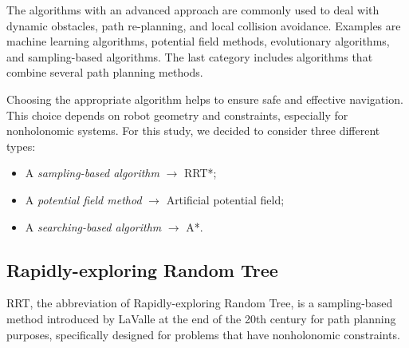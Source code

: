 The algorithms with an advanced approach are commonly used to deal with dynamic obstacles, path re-planning, and local collision avoidance. Examples are machine learning algorithms, potential field methods, evolutionary algorithms, and sampling-based algorithms. The last category includes algorithms that combine several path planning methods.

Choosing the appropriate algorithm helps to ensure safe and effective navigation. This choice depends on robot geometry and constraints, especially for nonholonomic systems. For this study, we decided to consider three different types:
\begin{itemize}[itemsep=0pt]
	\item A \textit{sampling-based algorithm} $\rightarrow$ RRT*;
	\item A \textit{potential field method} $\rightarrow$ Artificial potential field;
	\item A \textit{searching-based algorithm} $\rightarrow$ A*.
\end{itemize}
\subsection{Rapidly-exploring Random Tree}
RRT, the abbreviation of Rapidly-exploring Random Tree, is a sampling-based method introduced by LaValle \cite{lavalle1998rapidly} at the end of the 20th century for path planning purposes, specifically designed for problems that have nonholonomic constraints. 

